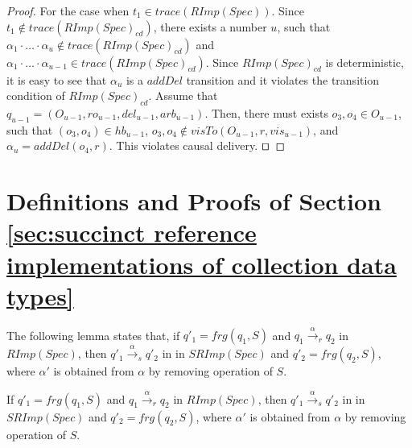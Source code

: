 \begin {proof}
For the case when $t_1 \in \mathit{trace}( \mathit{RImp}(\mathit{Spec}) )$. Since $t_1 \notin \mathit{trace}( \mathit{RImp}(\mathit{Spec})_{\mathit{cd}} )$, there exists a number $u$, such that $\alpha_1 \cdot \ldots \cdot \alpha_u \notin \mathit{trace}( \mathit{RImp}(\mathit{Spec})_{\mathit{cd}} )$ and $\alpha_1 \cdot \ldots \cdot \alpha_{u-1} \in \mathit{trace}( \mathit{RImp}(\mathit{Spec})_{\mathit{cd}} )$. Since $\mathit{RImp}(\mathit{Spec})_{\mathit{cd}}$ is deterministic, it is easy to see that $\alpha_u$ is a $\mathit{addDel}$ transition and it violates the transition condition of $\mathit{RImp}(\mathit{Spec})_{\mathit{cd}}$. Assume that $q_{\mathit{u-1}} = (O_{u-1},\mathit{ro}_{u-1},\mathit{del}_{u-1},\mathit{arb}_{u-1})$. Then, there must exists $o_3,o_4 \in O_{u-1}$, such that $(o_3,o_4) \in \mathit{hb}_{u-1}$, $o_3,o_4 \notin \mathit{visTo}(O_{u-1},r,\mathit{vis}_{u-1})$, and $\alpha_u = \mathit{addDel}(o_4,r)$. This violates causal delivery. $\qed$ 
\end {proof}













\section{Definitions and Proofs of Section \ref{sec:succinct reference implementations of collection data types}}
\label{sec:appendix definitions and proofs of section succinct reference implementations of collection data types} 

The following lemma states that, if $q'_1 = \mathit{frg}(q_1,S)$ and $q_1 {\xrightarrow{\alpha}}_r q_2$ in $\mathit{RImp}(\mathit{Spec})$, then $q'_1 {\xrightarrow{\alpha}}_s q'_2$ in in $\mathit{SRImp}(\mathit{Spec})$ and $q'_2 = \mathit{frg}(q_2,S)$, where $\alpha'$ is obtained from $\alpha$ by removing operation of $S$.  

\begin{lemma}
\label{lemma:RImpcdSpec contains all the sequences of RImpSpec that are causal delivery}
If $q'_1 = \mathit{frg}(q_1,S)$ and $q_1 {\xrightarrow{\alpha}}_r q_2$ in $\mathit{RImp}(\mathit{Spec})$, then $q'_1 {\xrightarrow{\alpha}}_s q'_2$ in in $\mathit{SRImp}(\mathit{Spec})$ and $q'_2 = \mathit{frg}(q_2,S)$, where $\alpha'$ is obtained from $\alpha$ by removing operation of $S$. 
\end{lemma}

